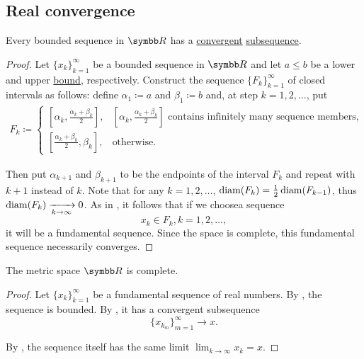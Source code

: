 \subsection{Real convergence}\label{subsec:real_vector_space_convergence}

\begin{Theorem}\label{def:bolzano_weierstrass}
  Every bounded sequence in \( \BR \) has a \hyperref[def:net_convergence/limit]{convergent} \hyperref[def:sequence]{subsequence}.
\end{Theorem}
\begin{proof}
  Let \( \{ x_k \}_{k=1}^\infty \) be a bounded sequence in \( \BR \) and let \( a \leq b \) be a lower and upper \hyperref[def:preordered_set/upper_lower_bound]{bound}, respectively. Construct the sequence \( \{ F_k \}_{k=1}^\infty \) of closed intervals as follows: define \( \alpha_1 \coloneqq a \) and \( \beta_1 \coloneqq b \) and, at step \( k = 1, 2, \ldots \), put
  \begin{align*}
    F_k \coloneqq \begin{cases}
      [\alpha_k, \tfrac{\alpha_k+\beta_k} 2], &[\alpha_k, \tfrac{\alpha_k+\beta_k} 2]\text{ contains infinitely many sequence members}, \\
      [\tfrac{\alpha_k+\beta_k} 2, \beta_k], &\text{otherwise}.
    \end{cases}
  \end{align*}

  Then put \( \alpha_{k+1} \) and \( \beta_{k+1} \) to be the endpoints of the interval \( F_k \) and repeat with \( k+1 \) instead of \( k \). Note that for any \( k = 1, 2, \ldots \), \( \operatorname{diam}(F_k) = \tfrac 1 2 \operatorname{diam}(F_{k-1}) \), thus \( \operatorname{diam}(F_k) \xrightarrow[k \to \infty]{} 0 \). As in , it follows that if we choose\AOC a sequence
  \begin{equation*}
    x_k \in F_k, k = 1, 2, \ldots,
  \end{equation*}
  it will be a fundamental sequence. Since the space is complete, this fundamental sequence necessarily converges.
\end{proof}

\begin{Theorem}\label{def:real_numbers_complete_metric_space}
  The metric space \( \BR \) is complete.
\end{Theorem}
\begin{proof}
  Let \( \{ x_k \}_{k=1}^\infty \) be a fundamental sequence of real numbers. By , the sequence is bounded. By , it has a convergent subsequence
  \begin{equation*}
    \{ x_{k_m} \}_{m=1}^\infty \to x.
  \end{equation*}

  By , the sequence itself has the same limit \( \lim_{k \to \infty} x_k = x \).
\end{proof}

